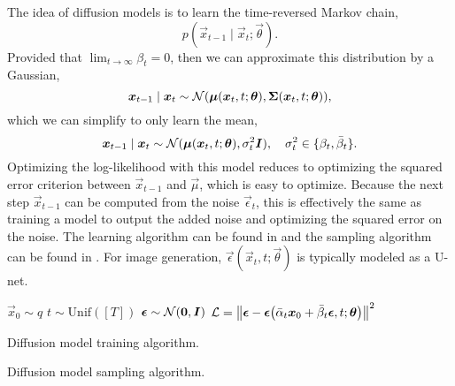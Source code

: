 The idea of diffusion models is to learn the time-reversed Markov chain, \[
    p(\vec{x}_{t-1} \mid \vec{x}_t; \vec{\theta}).
\]
Provided that $\lim_{t\to \infty} \beta_t = 0$, then we can approximate this distribution by a
Gaussian, \[
    \bm{x}_{t-1} \mid \bm{x}_t \sim \mathcal{N}(\bm{\mu}(\bm{x}_t, t; \bm{\theta}), \bm{\Sigma}(\bm{x}_t, t; \bm{\theta})),
\]
which we can simplify to only learn the mean, \[
    \bm{x}_{t-1} \mid \bm{x}_t \sim \mathcal{N}(\bm{\mu}(\bm{x}_t, t; \bm{\theta}), \sigma_t^2 \bm{I}), \quad \sigma_t^2 \in \{ \beta_t, \bar{\beta}_t \}.
\]
Optimizing the log-likelihood with this model reduces to optimizing the squared error criterion
between $\vec{x}_{t-1}$ and $\vec{\mu}$, which is easy to optimize. Because the next step
$\vec{x}_{t-1}$ can be computed from the noise $\vec{\epsilon}_t$, this is effectively the same as
training a model to output the added noise and optimizing \wrt the squared error on the noise. The
learning algorithm can be found in  and the sampling algorithm can be found
in . For image generation, $\vec{\epsilon}(\vec{x}_t, t; \vec{\theta})$ is
typically modeled as a U-net.

\begin{algorithm}[t]
    \begin{algorithmic}[1]
        \State $\vec{x}_0 \sim q$
        \State $t \sim \mathrm{Unif}([T])$
        \State $\bm{\epsilon} \sim \mathcal{N}(\bm{0}, \bm{I})$
        \State $\mathcal{L} = \lft\| \vec{\epsilon} - \vec{\epsilon}\lft( \bar{\alpha}_t \vec{x}_0 + \bar{\beta}_t \vec{\epsilon}, t; \vec{\theta} \rgt) \rgt\|^2$
        \EndWhile
    \end{algorithmic}
    \label{alg:dm-training}
    \caption{Diffusion model training algorithm.}
\end{algorithm}

\begin{algorithm}[t]
    \begin{algorithmic}[1]
        \Require{$\{ \beta_t \}_{t=1}^T$, $\vec{\theta}$
        \State $\vec{x}_T \sim \mathcal{N}(\vec{0}, \mat{I})$
        \For{$t = T, \ldots, 1$}
        \State $\vec{z} \sim \mathcal{N}(\vec{0}, \mat{I})$ if $t > 1$ else $\vec{z} = \vec{0}$
        \State $\vec{x}_{t-1} = \frac{1}{\alpha_t} \lft( \vec{x}_t - \frac{\beta_t^2}{\bar{\beta}_t} \vec{\epsilon}(\vec{x}_t, t; \vec{\theta}) \rgt) + \sigma_t \vec{z}$
        \EndFor
        \State \Return $\vec{x}_0$
    \end{algorithmic}
    \label{alg:dm-sampling}
    \caption{Diffusion model sampling algorithm.}
\end{algorithm}
